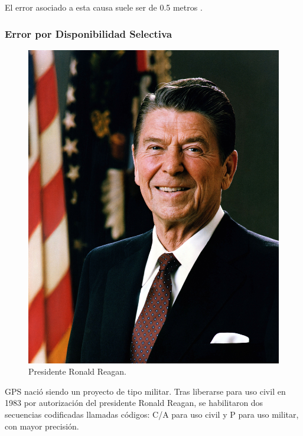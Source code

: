 El error asociado a esta causa suele ser de 0.5 metros \cite{fallas2002sistema}.

\subsubsection{Error por Disponibilidad Selectiva}

\begin{figure}[!ht]
\centering
\includegraphics[scale=0.30]{Figures/RonaldReagan}
\caption[Presidente Ronald Reagan.]{Presidente Ronald Reagan\footnotemark.}
\label{fig:ErrDis}
\end{figure}


GPS nació siendo un proyecto de tipo militar. Tras liberarse para uso civil en 1983 por autorización del presidente Ronald Reagan, se habilitaron dos secuencias codificadas llamadas códigos: C/A para uso civil y P para uso militar, con mayor precisión. \\

